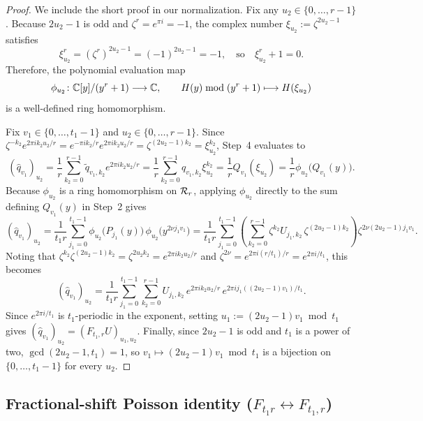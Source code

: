 \begin{proof}
We include the short proof in our normalization. Fix any $u_2 \in \{0, \dots, r-1\}$. Because $2u_2 - 1$ is odd and $\zeta^r = e^{\pi i} = -1$, the complex number $\xi_{u_2} := \zeta^{2u_2 - 1}$ satisfies
\[
  \xi_{u_2}^r = (\zeta^r)^{2u_2 - 1} = (-1)^{2u_2 - 1} = -1, \quad \text{so} \quad \xi_{u_2}^r + 1 = 0.
\]
Therefore, the polynomial evaluation map
\[
  \phi_{u_2}\colon \mathbb{C}[y]/(y^r + 1) \longrightarrow \mathbb{C}, \qquad H(y) \bmod (y^r + 1) \longmapsto H(\xi_{u_2})
\]
is a well-defined ring homomorphism.

Fix $v_1 \in \{0, \dots, t_1-1\}$ and $u_2 \in \{0, \dots, r-1\}$. Since $\zeta^{-k_2} e^{2\pi i k_2 u_2 / r} = e^{-\pi i k_2 / r} e^{2\pi i k_2 u_2 / r} = \zeta^{(2u_2 - 1)k_2} = \xi_{u_2}^{k_2}$, Step~4 evaluates to
\[
  (\hat{q}_{v_1})_{u_2} = \frac{1}{r} \sum_{k_2=0}^{r-1} \tilde{q}_{v_1, k_2} e^{2\pi i k_2 u_2 / r} = \frac{1}{r} \sum_{k_2=0}^{r-1} q_{v_1, k_2} \xi_{u_2}^{k_2} = \frac{1}{r} Q_{v_1}(\xi_{u_2}) = \frac{1}{r} \phi_{u_2}\bigl(Q_{v_1}(y)\bigr).
\]
Because $\phi_{u_2}$ is a ring homomorphism on $\mathcal{R}_r$, applying $\phi_{u_2}$ directly to the sum defining $Q_{v_1}(y)$ in Step~2 gives
\[
  (\hat{q}_{v_1})_{u_2} = \frac{1}{t_1 r} \sum_{j_1=0}^{t_1-1} \phi_{u_2}\bigl(P_{j_1}(y)\bigr) \, \phi_{u_2}\bigl(y^{2\nu j_1 v_1}\bigr) = \frac{1}{t_1 r} \sum_{j_1=0}^{t_1-1} \left(\sum_{k_2=0}^{r-1} \zeta^{k_2} U_{j_1, k_2} \, \zeta^{(2u_2 - 1)k_2}\right) \zeta^{2\nu (2u_2 - 1) j_1 v_1}.
\]
Noting that $\zeta^{k_2} \zeta^{(2u_2 - 1)k_2} = \zeta^{2 u_2 k_2} = e^{2\pi i k_2 u_2 / r}$ and $\zeta^{2\nu} = e^{2\pi i (r/t_1) / r} = e^{2\pi i / t_1}$, this becomes
\[
  (\hat{q}_{v_1})_{u_2} = \frac{1}{t_1 r} \sum_{j_1=0}^{t_1-1} \sum_{k_2=0}^{r-1} U_{j_1, k_2} \, e^{2\pi i k_2 u_2 / r} \, e^{2\pi i j_1 ((2u_2 - 1) v_1) / t_1}.
\]
Since $e^{2\pi i / t_1}$ is $t_1$-periodic in the exponent, setting $u_1 := (2u_2 - 1) v_1 \bmod t_1$ gives $(\hat{q}_{v_1})_{u_2} = (F_{t_1, r} U)_{u_1, u_2}$. Finally, since $2u_2 - 1$ is odd and $t_1$ is a power of two, $\gcd(2u_2 - 1, t_1) = 1$, so $v_1 \mapsto (2u_2 - 1) v_1 \bmod t_1$ is a bijection on $\{0, \dots, t_1-1\}$ for every $u_2$.
\end{proof}

\subsection{Fractional-shift Poisson identity (\texorpdfstring{$F_{t_1 r} \leftrightarrow F_{t_1, r}$}{F(t1 r) <-> F(t1, r)})}\label{sec:poisson}

